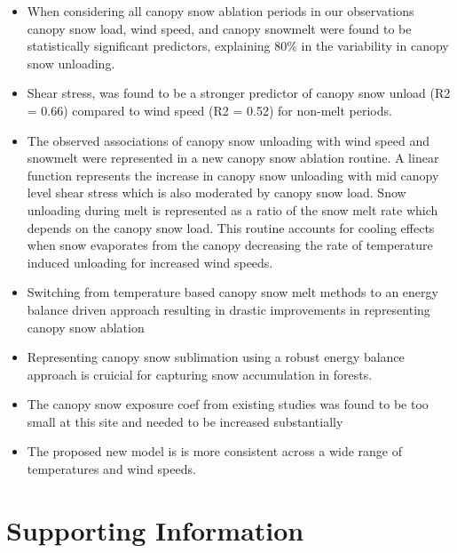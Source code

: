 \documentclass[
  letterpaper,
  DIV=11,
  numbers=noendperiod]{scrartcl}
\providecommand{\tightlist}{%
  \setlength{\itemsep}{0pt}\setlength{\parskip}{0pt}}\usepackage{longtable,booktabs,array}
\begin{document}
\begin{itemize}
\tightlist
\item
  When considering all canopy snow ablation periods in our observations
  canopy snow load, wind speed, and canopy snowmelt were found to be
  statistically significant predictors, explaining 80\% in the
  variability in canopy snow unloading.
\item
  Shear stress, was found to be a stronger predictor of canopy snow
  unload (R2 = 0.66) compared to wind speed (R2 = 0.52) for non-melt
  periods.
\item
  The observed associations of canopy snow unloading with wind speed and
  snowmelt were represented in a new canopy snow ablation routine. A
  linear function represents the increase in canopy snow unloading with
  mid canopy level shear stress which is also moderated by canopy snow
  load. Snow unloading during melt is represented as a ratio of the snow
  melt rate which depends on the canopy snow load. This routine accounts
  for cooling effects when snow evaporates from the canopy decreasing
  the rate of temperature induced unloading for increased wind speeds.
\item
  Switching from temperature based canopy snow melt methods to an energy
  balance driven approach resulting in drastic improvements in
  representing canopy snow ablation
\item
  Representing canopy snow sublimation using a robust energy balance
  approach is cruicial for capturing snow accumulation in forests.
\item
  The canopy snow exposure coef from existing studies was found to be
  too small at this site and needed to be increased substantially
\item
  The proposed new model is is more consistent across a wide range of
  temperatures and wind speeds.
\end{itemize}

\section{Supporting Information}\label{supporting-information}
\end{document}
